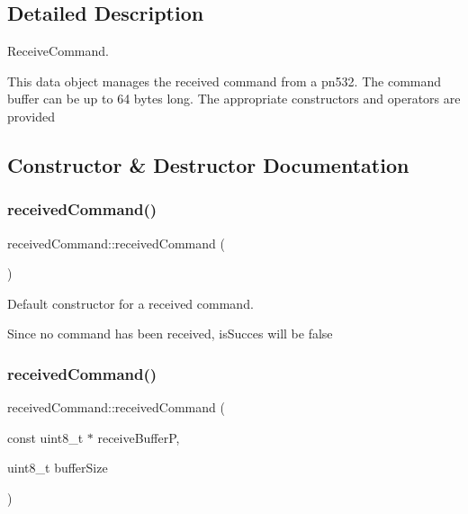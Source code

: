 \subsection{Detailed Description}
Receive\+Command. 

This data object manages the received command from a pn532. The command buffer can be up to 64 bytes long. The appropriate constructors and operators are provided 

\subsection{Constructor \& Destructor Documentation}
\mbox{\label{classreceivedCommand_afb5a185c80e16ed6fa13c3fad7166e2a}} 
\subsubsection{\texorpdfstring{received\+Command()}{receivedCommand()}\hspace{0.1cm}{\footnotesize\ttfamily [1/2]}}
{\footnotesize\ttfamily received\+Command\+::received\+Command (\begin{DoxyParamCaption}{ }\end{DoxyParamCaption})\hspace{0.3cm}{\ttfamily [inline]}}



Default constructor for a received command. 

Since no command has been received, is\+Succes will be false \mbox{\label{classreceivedCommand_a3bfe79f6fc149ea4c2f42a86fe5081cb}} 
\subsubsection{\texorpdfstring{received\+Command()}{receivedCommand()}\hspace{0.1cm}{\footnotesize\ttfamily [2/2]}}
{\footnotesize\ttfamily received\+Command\+::received\+Command (\begin{DoxyParamCaption}\item[{const uint8\+\_\+t $\ast$}]{receive\+BufferP,  }\item[{uint8\+\_\+t}]{buffer\+Size }\end{DoxyParamCaption})}



